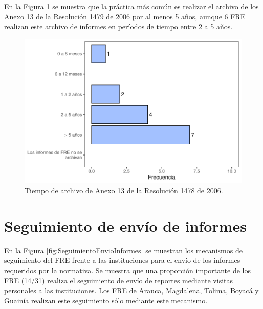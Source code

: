 \documentclass[
  oneside]{book}
\begin{document}
En la Figura \ref{fig:ArchivoInformesFRE} se muestra que la práctica más común es realizar el archivo de los Anexo 13 de la Resolución 1479 de 2006 por al menos 5 años, aunque 6 FRE realizan este archivo de informes en períodos de tiempo entre 2 a 5 años.

\begin{figure}[b!]

{\centering \includegraphics[width=0.95\linewidth]{InformeFinal_files/figure-latex/ArchivoInformesFRE-1} 

}

\caption{Tiempo de archivo de Anexo 13 de la Resolución 1478 de 2006.}\label{fig:ArchivoInformesFRE}
\end{figure}

\hypertarget{seguimiento-de-envuxedo-de-informes}{%
\section{Seguimiento de envío de informes}\label{seguimiento-de-envuxedo-de-informes}}

En la Figura \ref{fig:SeguimientoEnvioInformes} se muestran los mecanismos de seguimiento del FRE frente a las instituciones para el envío de los informes requeridos por la normativa. Se muestra que una proporción importante de los FRE (14/31) realiza el seguimiento de envío de reportes mediante visitas personales a las instituciones. Los FRE de Arauca, Magdalena, Tolima, Boyacá y Guainía realizan este seguimiento sólo mediante este mecanismo.
\end{document}
